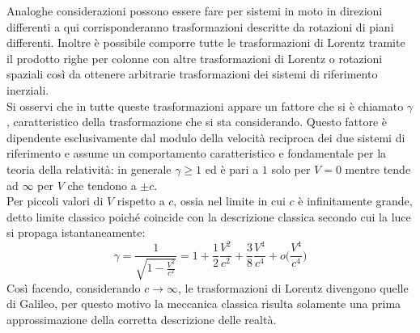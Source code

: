 Analoghe considerazioni possono essere fare per sistemi in moto in direzioni differenti a qui corrisponderanno trasformazioni descritte da rotazioni di piani differenti. Inoltre è possibile comporre tutte le trasformazioni di Lorentz tramite il prodotto righe per colonne con altre trasformazioni di Lorentz o rotazioni spaziali così da ottenere arbitrarie trasformazioni dei sistemi di riferimento inerziali.\\
Si osservi che in tutte queste trasformazioni appare un fattore che si è chiamato $\gamma$, caratteristico della trasformazione che si sta considerando. Questo fattore è dipendente esclusivamente dal modulo della velocità reciproca dei due sistemi di riferimento e assume un comportamento caratteristico e fondamentale per la teoria della relatività: in generale $\gamma\geq 1$ ed è pari a $1$ solo per $V=0$ mentre tende ad $\infty$ per $V$ che tendono a $\pm c$.\\
Per piccoli valori di $V$ rispetto a $c$, ossia nel limite in cui $c$ è infinitamente grande, detto limite classico poiché coincide con la descrizione classica secondo cui la luce si propaga istantaneamente:
\begin{equation}
    \gamma=\frac{1}{\sqrt{1-\frac{V^2}{c^2}}}=1+\frac12\frac{V^2}{c^2}+\frac38\frac{V^4}{c^4}+o\bigg(\frac{V^4}{c^4}\bigg)
    \label{limiteClassicoGamma}
\end{equation}
Così facendo, considerando $c\rightarrow\infty$, le trasformazioni di Lorentz divengono quelle di Galileo, per questo motivo la meccanica classica risulta solamente una prima approssimazione della corretta descrizione delle realtà.

